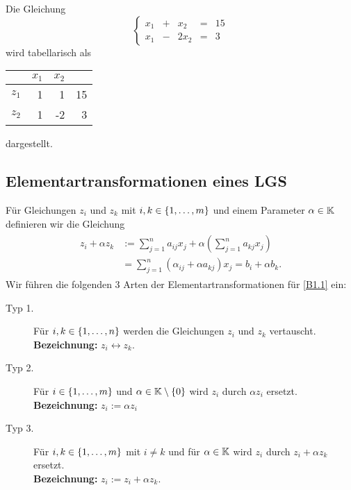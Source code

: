 \begin{bsp}
	Die Gleichung 
	\[
		 \left\{ \begin{array}{rcrcr}
		x_1 &+& x_2 &=& 15\\
		x_1 &-& 2x_2 &=& 3
	\end{array} \right. 
	\]
	wird tabellarisch als 
	\begin{center}
	\begin{tabular}{r|rr|r}
		& $ x_1 $ & $ x_2 $ & \\
		\hline
		$ z_1 $ & 1 & 1 & 15 \\
		$ z_2 $ & 1 & -2 & 3 \\
		\hline
	\end{tabular}
	\end{center} 
	dargestellt. 
\end{bsp}
 
\subsection{Elementartransformationen eines LGS}

Für Gleichungen $ z_i $ und $ z_k $ mit $ i,k \in \{ 1,\ldots,m \} $ und einem Parameter $ \alpha \in \mathbb K $ definieren wir die Gleichung
\begin{align}
\begin{split}
	z_i + \alpha z_k &:= \sum_{j=1}^{n} a_{ij} x_j + \alpha \left( \sum_{j=1}^{n} a_{kj}x_j \right) \\
	&= \sum_{j=1}^{n}\left( \alpha_{ij} + \alpha a_{kj} \right)x_j = b_i + \alpha b_k.
\end{split}
\end{align}
Wir führen die folgenden 3 Arten der Elementartransformationen für \eqref{B1.1} ein:
\begin{description}
	\item[Typ 1.]
		Für $ i,k \in \{ 1,\ldots,n \} $ werden die Gleichungen $ z_i $ und $ z_k $ vertauscht.
		\\ \textbf{Bezeichnung:} $ z_i \leftrightarrow z_k $.
	\item[Typ 2.]
		Für $ i \in \{ 1,\ldots,m \} $ und $ \alpha \in \mathbb K\setminus\{0\} $ wird $ z_i $ durch $ \alpha z_i $ ersetzt. \\ 
		\textbf{Bezeichnung:} $ z_i := \alpha z_i $ 
	\item[Typ 3.]
		Für $ i,k \in \{ 1,\ldots,m \} $ mit $ i \neq k $ und für $ \alpha \in \mathbb K $ wird $ z_i $ durch $ z_i + \alpha z_k $ ersetzt. \\ 
		\textbf{Bezeichnung:} $ z_i :=  z_i + \alpha z_k $.
\end{description}

